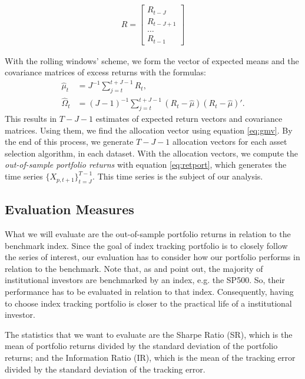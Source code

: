 \documentclass[preprint, doubleblind, authoryear,10pt]{elsarticle}
\begin{document}
\begin{align*}
R =
\begin{bmatrix}
	R_{t-J}	\\ R_{t-J+1} \\ \dots \\ R_{t-1}
\end{bmatrix}
\end{align*}

With the rolling windows' scheme, we form the vector of expected means and the covariance matrices of excess returns with the formulas:
\begin{align}
	\hat{\mu}_{t} &= J^{-1}\sum_{j=t}^{t+J-1} R_{t},
	\\
	\hat{\Omega}_{t} &= (J-1)^{-1} \sum_{j=t}^{t+J-1}(R_{t} - \hat{\mu})(R_{t} - \hat{\mu})'.
\end{align}
This results in $T-J-1$ estimates of expected return vectors and covariance matrices.
Using them, we find the allocation vector using equation \eqref{eq:gmv}.
By the end of this process, we generate $T-J-1$ allocation vectors for each asset selection algorithm, in each dataset.
With the allocation vectors, we compute the \textit{out-of-sample portfolio returns} with equation \eqref{eq:retport}, which generates the time series $\{X_{p,t+1}\}_{t=J}^{T-1}$.
This time series is the subject of our analysis. 

\subsection{Evaluation Measures} %

What we will evaluate are the out-of-sample portfolio returns in relation to the benchmark index.
Since the goal of index tracking portfolio is to closely follow the series of interest, our evaluation has to consider how our portfolio performs in relation to the benchmark.
Note that, as \cite{tz2011} and \cite{liu-2009} point out, the majority of institutional investors are benchmarked by an index, e.g. the SP500.
So, their performance has to be evaluated in relation to that index.
Consequently, having to choose index tracking portfolio is closer to the practical life of a institutional investor.


The statistics that we want to evaluate are the Sharpe Ratio (SR), which is the mean of portfolio returns divided by the standard deviation of the portfolio returns; and the Information Ratio (IR), which is the mean of the tracking error divided by the standard deviation of the tracking error.
\end{document}
